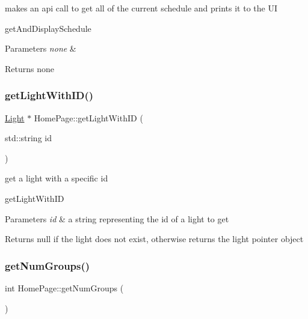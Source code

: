 makes an api call to get all of the current schedule and prints it to the UI 

get\+And\+Display\+Schedule 
\begin{DoxyParams}{Parameters}
{\em none} & \\
\hline
\end{DoxyParams}
\begin{DoxyReturn}{Returns}
none 
\end{DoxyReturn}
\mbox{\label{class_home_page_ac9c95668c61d02a9ed50675402296d66}} 
\subsubsection{\texorpdfstring{get\+Light\+With\+I\+D()}{getLightWithID()}}
{\footnotesize\ttfamily \hyperlink{class_light}{Light} $\ast$ Home\+Page\+::get\+Light\+With\+ID (\begin{DoxyParamCaption}\item[{std\+::string}]{id }\end{DoxyParamCaption})}



get a light with a specific id 

get\+Light\+With\+ID 
\begin{DoxyParams}{Parameters}
{\em id} & a string representing the id of a light to get \\
\hline
\end{DoxyParams}
\begin{DoxyReturn}{Returns}
null if the light does not exist, otherwise returns the light pointer object 
\end{DoxyReturn}
\mbox{\label{class_home_page_a04cc4e1d2ae6d6e1a36c407fa6db8bb4}} 
\subsubsection{\texorpdfstring{get\+Num\+Groups()}{getNumGroups()}}
{\footnotesize\ttfamily int Home\+Page\+::get\+Num\+Groups (\begin{DoxyParamCaption}{ }\end{DoxyParamCaption})}



